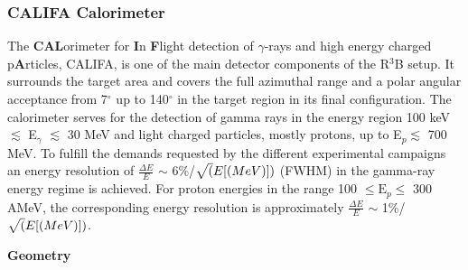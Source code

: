 \subsubsection{CALIFA Calorimeter}\label{sec:califa}
The \textbf{CAL}orimeter for \textbf{I}n \textbf{F}light detection of $\gamma$-rays and high energy charged p\textbf{A}rticles, CALIFA, is one of the main detector components of the R$^3$B setup. It surrounds the target area and covers the full azimuthal range and a polar angular acceptance from 7$^{\circ}$ up to 140$^{\circ}$ in the target region in its final configuration. The calorimeter serves for the detection of gamma rays in the energy region 100 keV $\lesssim$ E$_{\gamma}$ $\lesssim$ 30 MeV and light charged particles, mostly protons, up to E$_p \lesssim$ 700 MeV. To fulfill the demands requested by the different experimental campaigns an energy resolution of $\frac{\Delta E}{E}$ $\sim$ 6\%/$\sqrt(E[\text(MeV)])$ (FWHM) in the gamma-ray energy regime is achieved. For proton energies in the range 100 $\leq \text{E}_p \leq$ 300 AMeV, the corresponding energy resolution is approximately $\frac{\Delta E}{E}$ $\sim$ 1\%/$\sqrt(E[\text(MeV)])$.\newline

\textbf{Geometry}\newline

